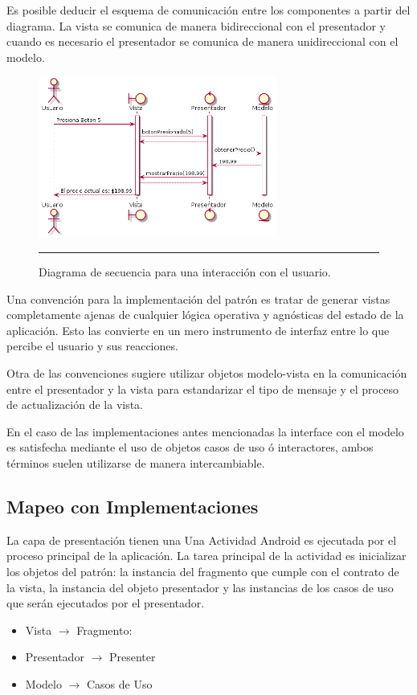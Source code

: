 Es posible deducir el esquema de comunicación entre los componentes a partir del diagrama. La vista se comunica de manera bidireccional con el presentador y cuando es necesario el presentador se comunica de manera unidireccional con el modelo.

\begin{figure}[htbp]
	\centering
	\includegraphics[width=0.7\textwidth]{Figures/uml_mvp_sequence.png}
	\rule{35em}{1pt}
	\caption[MVP Sequence]{Diagrama de secuencia para una interacción con el usuario.}
	\label{fig:uml_mvp_sequence}
\end{figure}

Una convención para la implementación del patrón es tratar de generar vistas completamente ajenas de cualquier lógica operativa y agnósticas del estado de la aplicación. Esto las convierte en un mero instrumento de interfaz entre lo que percibe el usuario y sus reacciones. 

Otra de las convenciones sugiere utilizar objetos modelo-vista en la comunicación entre el presentador y la vista para estandarizar el tipo de mensaje y el proceso de actualización de la vista.

En el caso de las implementaciones antes mencionadas la interface con el modelo es satisfecha mediante el uso de objetos casos de uso ó interactores, ambos términos suelen utilizarse de manera intercambiable.

\subsection{Mapeo con Implementaciones}
La capa de presentación tienen una
Una Actividad Android es ejecutada por el proceso principal de la aplicación. La tarea principal de la actividad es inicializar los objetos del patrón: la instancia del fragmento que cumple con el contrato de la vista, la instancia del objeto presentador y las instancias de los casos de uso que serán ejecutados por el presentador.
\begin{itemize}
	\item Vista $\rightarrow$ Fragmento: 
	\item Presentador $\rightarrow$ Presenter
	\item Modelo $\rightarrow$ Casos de Uso
\end{itemize}

